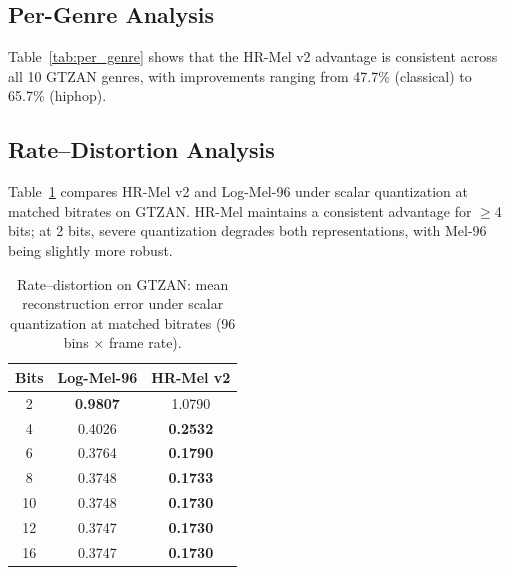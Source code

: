\documentclass[twocolumn]{article}
\begin{document}
\subsection{Per-Genre Analysis}

Table~\ref{tab:per_genre} shows that the HR-Mel v2 advantage is consistent across all 10 GTZAN genres, with improvements ranging from 47.7\% (classical) to 65.7\% (hiphop).

\begin{table}[t]
\centering
\caption{Per-genre reconstruction error on GTZAN (Mel-96 vs HR-Mel v2).}
\label{tab:per_genre}
\small
{}
\end{table}

\subsection{Rate--Distortion Analysis}

Table~\ref{tab:rd} compares HR-Mel v2 and Log-Mel-96 under scalar quantization at matched bitrates on GTZAN. HR-Mel maintains a consistent advantage for $\geq$4 bits; at 2 bits, severe quantization degrades both representations, with Mel-96 being slightly more robust.

\begin{table}[t]
\centering
\caption{Rate--distortion on GTZAN: mean reconstruction error under scalar quantization at matched bitrates (96 bins $\times$ frame rate).}
\label{tab:rd}
\small
\begin{tabular}{@{}ccc@{}}
\toprule
Bits & Log-Mel-96 & HR-Mel v2 \\
\midrule
2  & \textbf{0.9807} & 1.0790 \\
4  & 0.4026 & \textbf{0.2532} \\
6  & 0.3764 & \textbf{0.1790} \\
8  & 0.3748 & \textbf{0.1733} \\
10 & 0.3748 & \textbf{0.1730} \\
12 & 0.3747 & \textbf{0.1730} \\
16 & 0.3747 & \textbf{0.1730} \\
\bottomrule
\end{tabular}
\end{table}
\end{document}
